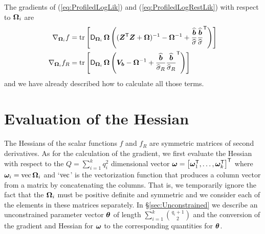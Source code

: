 \documentclass[12pt]{article}
\begin{document}
The gradients of (\ref{eq:ProfiledLogLik}) and (\ref{eq:ProfiledLogRestLik})
with respect to $\bm{\Omega}_i$ are
\begin{align}
  \label{eq:gradDev}
  \nabla_{\bm{\Omega}_i}f&=\operatorname{tr}\left[\operatorname{\mathsf{D}}_{\bm{\Omega}_i}\bm{\Omega}\left(
      (\bm{Z}^\mathsf{T}\bm{Z}+\bm{\Omega})^{-1}-\bm{\Omega}^{-1}+
      \frac{\widehat{\bm{b}}}{\widehat{\sigma}}
      \frac{\widehat{\bm{b}}}{\widehat{\sigma}}^\mathsf{T}\right)\right]\\
  \label{eq:gradDevRest}
  \nabla_{\bm{\Omega}_i} f_R&=\operatorname{tr}\left[\operatorname{\mathsf{D}}_{\bm{\Omega}_i}\bm{\Omega}\left(
      \bm{V}_{\bm{b}}-\bm{\Omega}^{-1}+
      \frac{\widehat{\bm{b}}}{\widehat{\sigma}_R}
      \frac{\widehat{\bm{b}}}{\widehat{\sigma}_R}^\mathsf{T}\right)\right]
\end{align}
and we have already described how to calculate all those terms.

\section{Evaluation of the Hessian}
\label{sec:Hessian}

The Hessians of the scalar functions $f$ and $f_R$ are symmetric
matrices of second derivatives.  As for the calculation of the
gradient, we first evaluate the Hessian with respect to the
$Q=\sum_{i=1}^k q_i^2$ dimensional vector
$\bm{\omega}=\left[\bm{\omega}_1^\mathsf{T},\dots,\bm{\omega}_k^\mathsf{T}\right]^\mathsf{T}$
where $\bm{\omega}_i=\operatorname{\mathrm{vec}}\bm{\Omega}_i$ and `$\operatorname{\mathrm{vec}}$' is the vectorization
function that produces a column vector from a matrix by concatenating
the columns.  That is, we temporarily ignore the fact that the
$\bm{\Omega}_i$ must be positive definite and symmetric and we consider each of the
elements in these matrices separately.  In \S\ref{sec:Unconstrained}
we describe an unconstrained parameter vector $\bm{\theta}$ of length
$\sum_{i=1}^k\binom{q_i+1}{2}$ and the conversion of the gradient and
Hessian for $\bm{\omega}$ to the corresponding quantities for $\bm{\theta}$.
\end{document}
